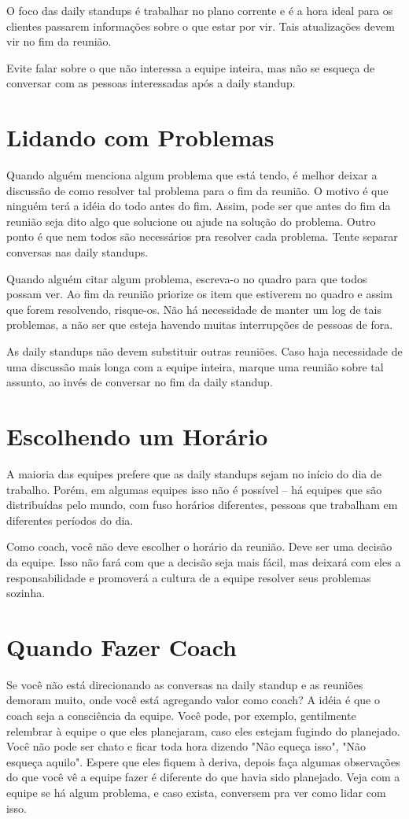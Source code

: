\documentclass[a4paper, 10pt, font=plain]{abnt}
\begin{document}
O foco das daily standups é trabalhar no plano corrente e é a hora ideal para os clientes passarem informações sobre o que estar por vir. Tais atualizações devem vir no fim da reunião.

Evite falar sobre o que não interessa a equipe inteira, mas não se esqueça de conversar com as pessoas interessadas após a daily standup.

\section{Lidando com Problemas}
Quando alguém menciona algum problema que está tendo, é melhor deixar a discussão de como resolver tal problema para o fim da reunião. O motivo é que ninguém terá a idéia do todo antes do fim. Assim, pode ser que antes do fim da reunião seja dito algo que solucione ou ajude na solução do problema. Outro ponto é que nem todos são necessários pra resolver cada problema. Tente separar conversas nas daily standups.

Quando alguém citar algum problema, escreva-o no quadro para que todos possam ver. Ao fim da reunião priorize os item que estiverem no quadro e assim que forem resolvendo, risque-os. Não há necessidade de manter um log de tais problemas, a não ser que esteja havendo muitas interrupções de pessoas de fora.

As daily standups não devem substituir outras reuniões. Caso haja necessidade de uma discussão mais longa com a equipe inteira, marque uma reunião sobre tal assunto, ao invés de conversar no fim da daily standup.


\section{Escolhendo um Horário}
A maioria das equipes prefere que as daily standups sejam no início do dia de trabalho. Porém, em algumas equipes isso não é possível -- há equipes que são distribuídas pelo mundo, com fuso horários diferentes, pessoas que trabalham em diferentes períodos do dia.

Como coach, você não deve escolher o horário da reunião. Deve ser uma decisão da equipe. Isso não fará com que a decisão seja mais fácil, mas deixará com eles a responsabilidade e promoverá a cultura de a equipe resolver seus problemas sozinha.


\section{Quando Fazer Coach}
Se você não está direcionando as conversas na daily standup e as reuniões demoram muito, onde você está agregando valor como coach? A idéia é que o coach seja a consciência da equipe. Você pode, por exemplo, gentilmente relembrar à equipe o que eles planejaram, caso eles estejam fugindo do planejado. Você não pode ser chato e ficar toda hora dizendo "Não equeça isso", "Não esqueça aquilo". Espere que eles fiquem à deriva, depois faça algumas observações do que você vê a equipe fazer é diferente do que havia sido planejado. Veja com a equipe se há algum problema, e caso exista, conversem pra ver como lidar com isso.
\end{document}
